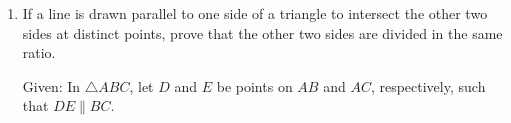 \begin{enumerate}[label=\thesubsection.\arabic*, ref=\thesubsection.\theenumi]
The \(35^\text{th}\) term is
\begin{align}
a_{35}=a+34d
\end{align}
The sum of the last \(6\) terms is
\begin{align}
687=\frac{6}{2}\sbrak{2\brak{a+34d}+\brak{6-1}d}
\end{align}
\begin{align}
2a+73d=229 \label{eq:EE26BTECH11211_Prob_34.2.10}
\end{align}
Multiplying equation \eqref{eq:EE26BTECH11211_Prob_34.1.10} by \(2\),
\begin{align}
2a+8d=34 \label{eq:EE26BTECH11211_Prob_34.3.10}
\end{align}
Subtracting equation \eqref{eq:EE26BTECH11211_Prob_34.3.10} from equation \eqref{eq:EE26BTECH11211_Prob_34.2.10},
\begin{align}
65d=195
\end{align}
\begin{align}
d=3
\end{align}
Substituting \(d=3\) in equation \eqref{eq:EE26BTECH11211_Prob_34.1.10},
\begin{align}
a+4\brak{3}=17
\end{align}
\begin{align}
a=5
\end{align}
Now, the sum of all \(40\) terms is
\begin{align}
S_{40}=\frac{40}{2}\sbrak{2a+\brak{40-1}d}
\end{align}
\begin{align}
S_{40}=2540
\end{align}

\item
 If a line is drawn parallel to one side of a triangle to intersect the other two sides at distinct points, prove that the other two sides are divided in the same ratio.

\solution
Given: In \(\triangle ABC\), let \(D\) and \(E\) be points on \(AB\) and \(AC\), respectively, such that \(DE \parallel BC\).


\end{enumerate}
